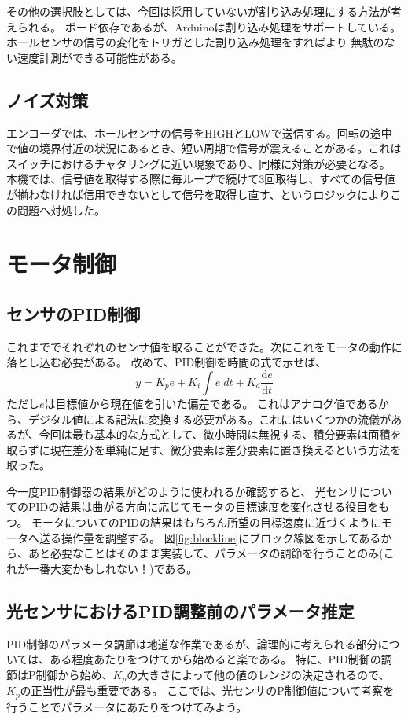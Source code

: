 \documentclass{ltjsreport}
\begin{document}
その他の選択肢としては、今回は採用していないが割り込み処理にする方法が考えられる。
ボード依存であるが、Arduinoは割り込み処理をサポートしている。ホールセンサの信号の変化をトリガとした割り込み処理をすればより
無駄のない速度計測ができる可能性がある。
\subsection{ノイズ対策}
エンコーダでは、ホールセンサの信号をHIGHとLOWで送信する。回転の途中で値の境界付近の状況にあるとき、短い周期で信号が震えることがある。これはスイッチにおけるチャタリングに近い現象であり、同様に対策が必要となる。
本機では、信号値を取得する際に毎ループで続けて3回取得し、すべての信号値が揃わなければ信用できないとして信号を取得し直す、というロジックによりこの問題へ対処した。



\section{モータ制御}


\subsection{センサのPID制御}\label{sec:SensorIntegration}
これまででそれぞれのセンサ値を取ることができた。次にこれをモータの動作に落とし込む必要がある。
改めて、PID制御を時間の式で示せば、
\[
  y = K_p e + K_i \int e \; dt + K_d  \frac{\mathrm{d}e}{\mathrm{d}t}
\]
ただし$e$は目標値から現在値を引いた偏差である。
これはアナログ値であるから、デジタル値による記法に変換する必要がある。これにはいくつかの流儀があるが、今回は最も基本的な方式として、微小時間は無視する、積分要素は面積を取らずに現在差分を単純に足す、微分要素は差分要素に置き換えるという方法を取った。

今一度PID制御器の結果がどのように使われるか確認すると、
光センサについてのPIDの結果は曲がる方向に応じてモータの目標速度を変化させる役目をもつ。
モータについてのPIDの結果はもちろん所望の目標速度に近づくようにモータへ送る操作量を調整する。
図\ref{fig:blockline}にブロック線図を示してあるから、あと必要なことはそのまま実装して、パラメータの調節を行うことのみ(これが一番大変かもしれない！)である。

\subsection{光センサにおけるPID調整前のパラメータ推定}\label{sec:PIDestimate}
PID制御のパラメータ調節は地道な作業であるが、論理的に考えられる部分については、ある程度あたりをつけてから始めると楽である。
特に、PID制御の調節はP制御から始め、$K_p$の大きさによって他の値のレンジの決定されるので、$K_p$の正当性が最も重要である。
ここでは、光センサのP制御値について考察を行うことでパラメータにあたりをつけてみよう。
\end{document}
